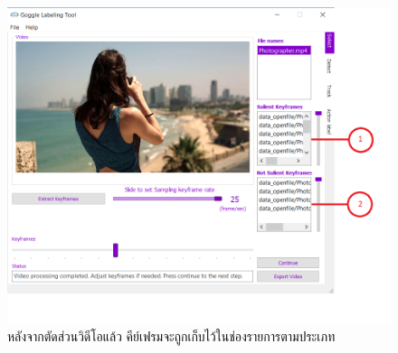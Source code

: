 \begin{figure}[!ht]
    \centering
    \includegraphics[width=1\textwidth]{chapter3/images/3_3/SelectTab_sampled.png}
    \caption{หลังจากตัดส่วนวิดีโอแล้ว คีย์เฟรมจะถูกเก็บไว้ในช่องรายการตามประเภท}
    \label{fig:SelectTab_sampled}
\end{figure}
